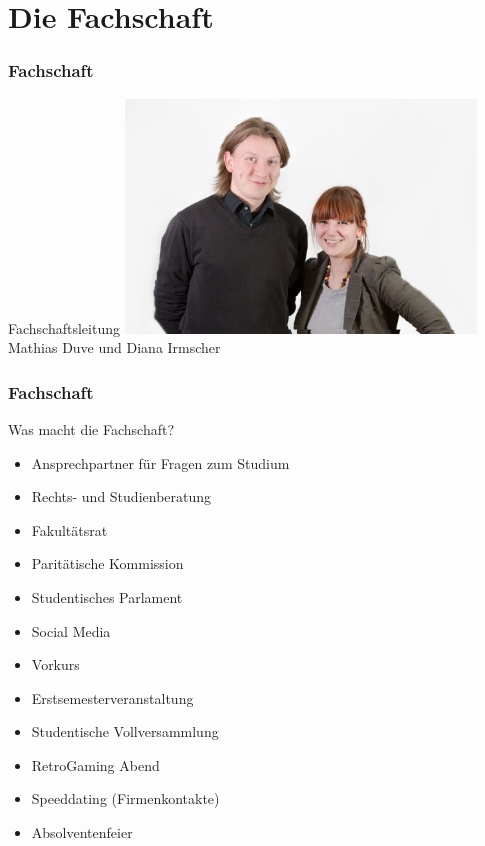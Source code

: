 \documentclass{beamer}
\begin{document}
	\section{Die Fachschaft}
	
	\begin{frame}
		\frametitle{Fachschaft}
		Fachschaftsleitung
		\center
		\includegraphics[width=0.7\textwidth]{matti_diana.jpg}
		\\Mathias Duve und Diana Irmscher
	\end{frame}
	
	\begin{frame}
		\frametitle{Fachschaft}
		Was macht die Fachschaft?
		\begin{itemize}
			\item Ansprechpartner für Fragen zum Studium
			\item Rechts- und Studienberatung
			\item Fakultätsrat
			\item Paritätische Kommission
			\item Studentisches Parlament
			\item Social Media
		\end{itemize}
		\bigskip
		\begin{itemize}
			\item Vorkurs
			\item Erstsemesterveranstaltung
			\item Studentische Vollversammlung
			\item RetroGaming Abend
			\item Speeddating (Firmenkontakte)
			\item Absolventenfeier
		\end{itemize}
	\end{frame}
	
\end{document}
